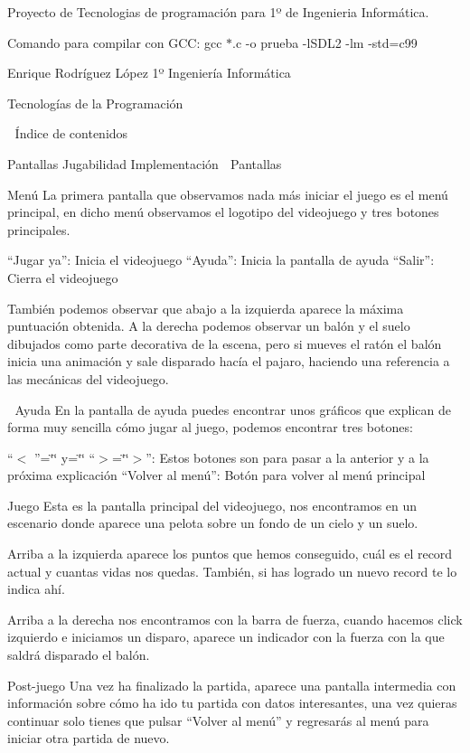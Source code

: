 Proyecto de Tecnologias de programación para 1º de Ingenieria Informática.

Comando para compilar con G\+CC\+: gcc $\ast$.c -\/o prueba -\/l\+S\+D\+L2 -\/lm -\/std=c99

Enrique Rodríguez López 1º Ingeniería Informática

Tecnologías de la Programación

 Índice de contenidos

Pantallas Jugabilidad Implementación  Pantallas

Menú La primera pantalla que observamos nada más iniciar el juego es el menú principal, en dicho menú observamos el logotipo del videojuego y tres botones principales.

“\+Jugar ya”\+: Inicia el videojuego “\+Ayuda”\+: Inicia la pantalla de ayuda “\+Salir”\+: Cierra el videojuego

También podemos observar que abajo a la izquierda aparece la máxima puntuación obtenida. A la derecha podemos observar un balón y el suelo dibujados como parte decorativa de la escena, pero si mueves el ratón el balón inicia una animación y sale disparado hacía el pajaro, haciendo una referencia a las mecánicas del videojuego.

 Ayuda En la pantalla de ayuda puedes encontrar unos gráficos que explican de forma muy sencilla cómo jugar al juego, podemos encontrar tres botones\+:

“$<$ ”=\char`\"{}\char`\"{} y=\char`\"{}\char`\"{} “$>$=\char`\"{}\char`\"{}$>$”\+: Estos botones son para pasar a la anterior y a la próxima explicación “\+Volver al menú”\+: Botón para volver al menú principal

Juego Esta es la pantalla principal del videojuego, nos encontramos en un escenario donde aparece una pelota sobre un fondo de un cielo y un suelo.

Arriba a la izquierda aparece los puntos que hemos conseguido, cuál es el record actual y cuantas vidas nos quedas. También, si has logrado un nuevo record te lo indica ahí.

Arriba a la derecha nos encontramos con la barra de fuerza, cuando hacemos click izquierdo e iniciamos un disparo, aparece un indicador con la fuerza con la que saldrá disparado el balón.

Post-\/juego Una vez ha finalizado la partida, aparece una pantalla intermedia con información sobre cómo ha ido tu partida con datos interesantes, una vez quieras continuar solo tienes que pulsar “\+Volver al menú” y regresarás al menú para iniciar otra partida de nuevo.

